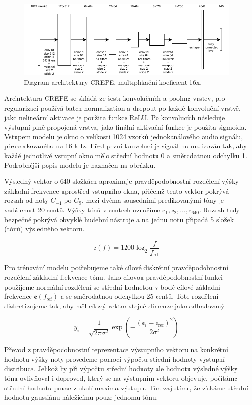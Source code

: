 \begin{figure}[h]\centering
\includegraphics{../img/crepe_arch}
\caption{Diagram architektury CREPE, multiplikační koeficient 16x.}
\label{obr:wavenet_dilated}
\end{figure}

Architektura CREPE se skládá ze šesti konvolučních a pooling vrstev, pro regularizaci používá batch normalization a dropout po každé konvoluční vrstvě, jako nelineární aktivace je použita funkce ReLU. Po konvolucích následuje výstupní plně propojená vrstva, jako finální aktivační funkce je použita sigmoida. Vstupem modelu je okno o velikosti 1024 vzorků jednokanálového audio signálu, převzorkovaného na 16 kHz. Před první konvolucí je signál normalizován tak, aby každé jednotlivé vstupní okno mělo střední hodnotu 0 a směrodatnou odchylku 1. Podrobnější popis modelu je naznačen na obrázku.

Výsledný vektor o 640 složkách aproximuje pravděpodobnostní rozdělení výšky základní frekvence uprostřed vstupního okna, přičemž tento vektor pokrývá rozsah od noty $C_{-1}$ po $G_{9}$, mezi dvěma sousedními predikovanými tóny je vzdálenost 20 centů. Výšky tónů v centech označíme $\cent_1, \cent_2, \dots, \cent_{640}$. Rozsah tedy bezpečně pokrývá obvyklé hudební nástroje a na jednu notu připadá 5 složek (tónů) výsledného vektoru.

    $$\cent(f) = 1200 \log_2{\frac{f}{f_{\mathrm{ref}}}}$$

Pro trénování modelu potřebujeme také cílové diskrétní pravděpodobnostní rozdělení základní frekvence tónu. Jako cílovou pravděpodobnostní funkci použijeme normální rozdělení se střední hodnotou v bodě cílové základní frekvence $\cent(f_{\mathrm{ref}})$ a se směrodatnou odchylkou 25 centů. Toto rozdělení diskretizujeme tak, aby měl cílový vektor stejné dimenze jako odhadovaný.

    $$y_i = \frac{1}{\sqrt{2 \pi \sigma^2}}\exp{(-\frac{(\cent_i - \cent_{\mathrm{ref}})^2}{2 \sigma^2})}$$

Převod z pravděpodobnostní reprezentace výstupního vektoru na konkrétní hodnotu výšky noty provedeme pomocí výpočtu střední hodnoty výstupní distribuce. Jelikož by při výpočtu střední hodnoty ale hodnotu výsledné výšky tónu ovlivňoval i doprovod, který se na výstupním vektoru objevuje, počítáme střední hodnotu pouze z okolí maxima výstupu. Tím zajistíme, že získáme střední hodnotu gaussiánu náležícímu pouze jednomu tónu.

